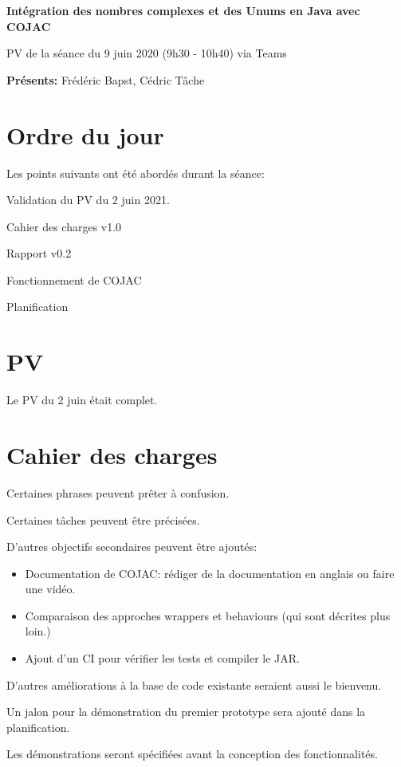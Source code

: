 \documentclass[11pt]{meetingmins}
\date{9 juin 2021}
\begin{document}
\begin {center} {
    \large \textbf {Intégration des nombres complexes et des Unums en Java avec COJAC}
}
\vspace {0.5ex}

PV de la séance du 9 juin 2020 (9h30 - 10h40) via Teams
\end {center} \vspace {1.5em}

\noindent
\textbf{Présents:} Frédéric Bapst, Cédric Tâche

\section{Ordre du jour}
Les points suivants ont été abordés durant la séance:
\begin{hiddenitems}
    \item Validation du PV du 2 juin 2021.
    \item Cahier des charges v1.0
    \item Rapport v0.2
    \item Fonctionnement de COJAC
    \item Planification
\end{hiddenitems}

\section{PV}
\begin{hiddenitems}
    \item Le PV du 2 juin était complet.
\end{hiddenitems}

\section{Cahier des charges}
\begin{hiddenitems}
    \item Certaines phrases peuvent prêter à confusion.
    \item Certaines tâches peuvent être précisées.
    \item D'autres objectifs secondaires peuvent être ajoutés:
    \begin{itemize}
        \item Documentation de COJAC: rédiger de la documentation en anglais ou faire une vidéo.
        \item Comparaison des approches wrappers et behaviours (qui sont décrites plus loin.)
        \item Ajout d'un CI pour vérifier les tests et compiler le JAR.
    \end{itemize}
    \item D'autres améliorations à la base de code existante seraient aussi le bienvenu.
    \item Un jalon pour la démonstration du premier prototype sera ajouté dans la planification.
    \item Les démonstrations seront spécifiées avant la conception des fonctionnalités.
\end{hiddenitems}
\end{document}
